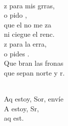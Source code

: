 \documentclass[12pt]{article}
\begin{document}
\begin{multicols*}{2}
\begin{cancion}[Envíame][Ixcís]
\begin{chorus}
	\end{chorus}%
	\jump\\
	z para mis grras, \\
	o pido , \\
	que el  no me za  \\
	ni  ciegue el renc.\\
	z para la erra,  \\
	o pides .\\
	Que bran las fronas \\
	que sepan norte y r.\\\jump\\
	\begin{chorus}%
	Aq estoy, Sor, envíe  \\
	A estoy, Sr, \\
	aq est.  \\
	\end{chorus}%
	\jump\\
\end{cancion}%


\end{multicols*}
\end{document}
